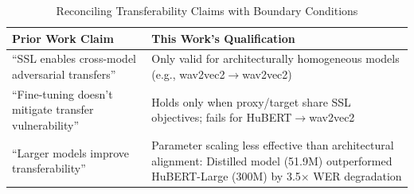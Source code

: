 \documentclass[../main.tex]{subfiles}
\begin{document}
\begin{table}[H]
\centering
\small
\caption{Summary of Black-Box Transfer Attack Performance at \(\epsilon=0.20\)}
\label{tab:transfer_summary}
\end{table}

\begin{table}[H]
\centering
\small
\caption{Reconciling Transferability Claims with Boundary Conditions}
\label{tab:transfer_claims}
\begin{tabular}{p{4.5cm}p{8.5cm}}
\toprule
{\textbf{Prior Work Claim}} & {\textbf{This Work’s Qualification}} \\
\midrule
{``SSL enables cross-model adversarial transfers''~\cite{olivier2023transferable}} & {Only valid for architecturally homogeneous models (e.g., wav2vec2\(\to\)wav2vec2)} \\
{``Fine-tuning doesn’t mitigate transfer vulnerability''~\cite{abdullah2023demystifying}} & {Holds only when proxy/target share SSL objectives; fails for HuBERT\(\to\)wav2vec2} \\
{``Larger models improve transferability''~\cite{gao2024transferable}} & {Parameter scaling less effective than architectural alignment: Distilled model (51.9M) outperformed HuBERT-Large (300M) by 3.5$\times$ WER degradation} \\

\bottomrule
\end{tabular}
\end{table}
\end{document}
